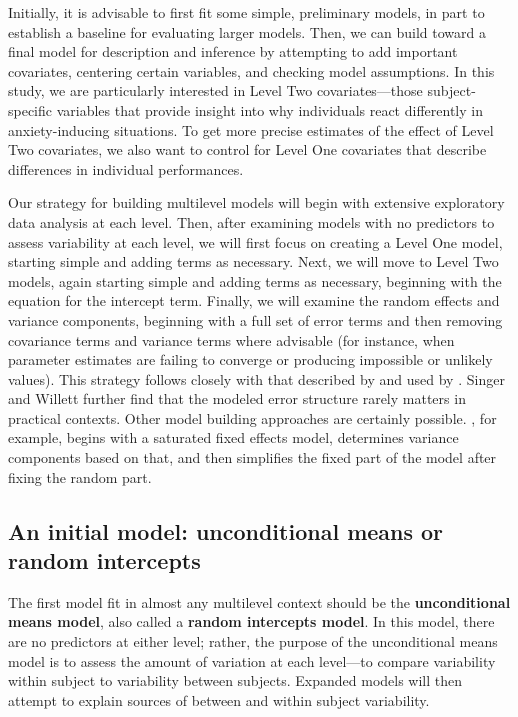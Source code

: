 \documentclass[
]{krantz}
\begin{document}
Initially, it is advisable to first fit some simple, preliminary models, in part to establish a baseline for evaluating larger models. Then, we can build toward a final model for description and inference by attempting to add important covariates, centering certain variables, and checking model assumptions. In this study, we are particularly interested in Level Two covariates---those subject-specific variables that provide insight into why individuals react differently in anxiety-inducing situations. To get more precise estimates of the effect of Level Two covariates, we also want to control for Level One covariates that describe differences in individual performances.

Our strategy for building multilevel models will begin with extensive exploratory data analysis at each level. Then, after examining models with no predictors to assess variability at each level, we will first focus on creating a Level One model, starting simple and adding terms as necessary. Next, we will move to Level Two models, again starting simple and adding terms as necessary, beginning with the equation for the intercept term. Finally, we will examine the random effects and variance components, beginning with a full set of error terms and then removing covariance terms and variance terms where advisable (for instance, when parameter estimates are failing to converge or producing impossible or unlikely values). This strategy follows closely with that described by \citet{Bryk2002} and used by \citet{Singer2003}. Singer and Willett further find that the modeled error structure rarely matters in practical contexts. Other model building approaches are certainly possible. \citet{Diggle2002}, for example, begins with a saturated fixed effects model, determines variance components based on that, and then simplifies the fixed part of the model after fixing the random part.

\hypertarget{modela}{%
\subsection{An initial model: unconditional means or random intercepts}\label{modela}}

The first model fit in almost any multilevel context should be the \textbf{unconditional means model}, also called a \textbf{random intercepts model}. In this model, there are no predictors at either level; rather, the purpose of the unconditional means model is to assess the amount of variation at each level---to compare variability within subject to variability between subjects. Expanded models will then attempt to explain sources of between and within subject variability.
\end{document}
